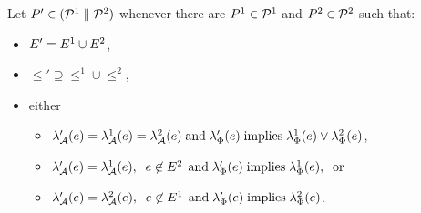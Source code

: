 \begin{definition}
Let $P' \in (\mathcal{P}^1 \parallel \mathcal{P}^2)$
whenever there are $P^1 \in \mathcal{P}^1$ and $P^2 \in \mathcal{P}^2$ such that:
\begin{itemize}
\item $E' = E^1 \cup E^2$,
\item ${\le'}\supseteq{\le^1}\cup{\le^2}$, %
\item either
  \begin{itemize}
  \item $\lambda_{\mathcal{A}}'(e) = \lambda_{\mathcal{A}}^1(e) = \lambda_{\mathcal{A}}^2(e)
    \;\allowbreak\text{and}\allowbreak\; \lambda_{\Phi}'(e) \; \allowbreak\text{implies}\allowbreak\; \lambda_{\Phi}^1(e) \lor \lambda_{\Phi}^2(e)$,
  \item $\lambda_{\mathcal{A}}'(e) = \lambda_{\mathcal{A}}^1(e),\;\; e \not\in E^2\,
    \;\allowbreak\text{and}\allowbreak\; \lambda_{\Phi}'(e) \; \allowbreak\text{implies}\allowbreak\; \lambda_{\Phi}^1(e),\; \; \allowbreak\text{or}\allowbreak\;$
  \item $\lambda_{\mathcal{A}}'(e) = \lambda_{\mathcal{A}}^2(e),\;\; e \not\in E^1\,
    \;\allowbreak\text{and}\allowbreak\; \lambda_{\Phi}'(e) \; \allowbreak\text{implies}\allowbreak\; \lambda_{\Phi}^2(e)$.
  \end{itemize}
\end{itemize}
\end{definition}
